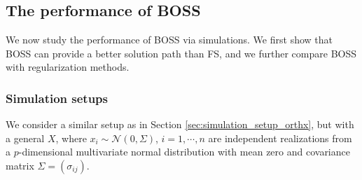 \subsection{The performance of BOSS}
We now study the performance of BOSS via simulations. We first show that BOSS can provide a better solution path than FS, and we further compare BOSS with regularization methods. 

\subsubsection{Simulation setups}
\label{sec:simulation_setup_generalx}
We consider a similar setup as in Section \ref{sec:simulation_setup_orthx}, but with a general $X$, where  $x_i\sim \mathcal{N}(0,\Sigma)$, $i=1,\cdots,n$ are independent realizations from a $p$-dimensional multivariate normal distribution with mean zero and covariance matrix $\Sigma=(\sigma_{ij})$. 

